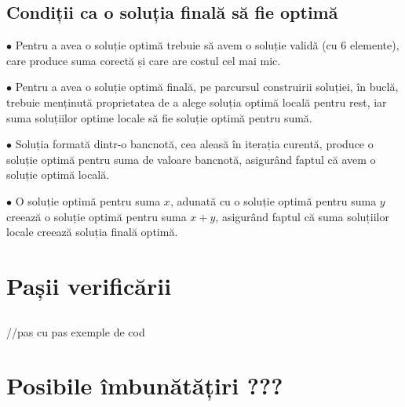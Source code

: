     \subsection{Condiții ca o soluția finală să fie optimă}
    $\bullet$ Pentru a avea o soluție optimă trebuie să avem o soluție validă (cu 6 elemente), care produce suma corectă
     și care are costul cel mai mic.\par
    $\bullet$ Pentru a avea o soluție optimă finală, pe parcursul construirii soluției, în buclă, trebuie menținută proprietatea
     de a alege soluția optimă locală pentru rest, iar suma soluțiilor optime locale să fie soluție optimă pentru sumă.\par
    $\bullet$ Soluția formată dintr-o bancnotă, cea aleasă în iterația curentă, produce o soluție optimă pentru suma 
    de valoare bancnotă, asigurând faptul că avem o soluție optimă locală.\par
    $\bullet$ O soluție optimă pentru suma $x$, adunată cu o soluție optimă pentru suma $y$ creează o soluție optimă pentru suma $x+y$, 
    asigurând faptul că suma soluțiilor locale creează soluția finală optimă.\par
    
\section{Pașii verificării}
    \subsection{}
    //pas cu pas exemple de cod
    
\section{Posibile îmbunătățiri ???}


